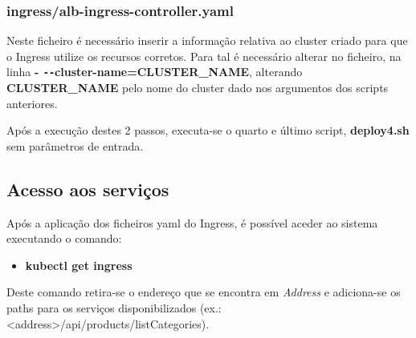 \documentclass[11pt,a4paper]{article}
\begin{document}
\subsubsection{ingress/alb-ingress-controller.yaml}
Neste ficheiro é necessário inserir a informação relativa ao cluster criado para que o Ingress utilize os recursos corretos. Para tal é necessário alterar no ficheiro, na linha \textbf{- \texttt{-{}-}cluster-name=CLUSTER\_NAME},
alterando \textbf{CLUSTER\_NAME} pelo nome do cluster dado nos argumentos dos scripts anteriores.

Após a execução destes 2 passos, executa-se o quarto e último script, \textbf{deploy4.sh} sem parâmetros de entrada.

\subsection{Acesso aos serviços}
Após a aplicação dos ficheiros yaml do Ingress, é possível aceder ao sistema executando o comando:
\begin{itemize}
	\item \textbf{kubectl get ingress}
\end{itemize}
Deste comando retira-se o endereço que se encontra em \textit{Address} e adiciona-se os paths para os serviços disponibilizados (ex.: <address>/api/products/listCategories).
\end{document}
